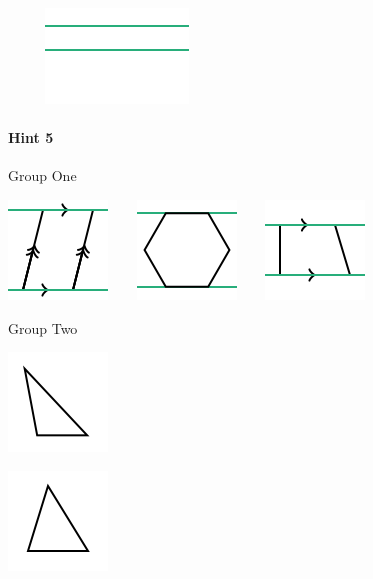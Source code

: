 \documentclass[twocolumn,10pt]{article}
\def\shrinkfactor{0.55}
\begin{document}
$\phantom{xxxx}$
\includegraphics[scale=\shrinkfactor]{figures/7cf1fbfb7516a57d37ad80007a3886c81c33f393.png}  


\paragraph{Hint 5}Group One 


\includegraphics[scale=\shrinkfactor]{figures/dc97e97ad57144cae5a8b5bfdc5d541d8d66aa00.png}$\phantom{xxx}$
\includegraphics[scale=\shrinkfactor]{figures/a8914ec8b688d03af4fc47bdfdb83edcce453d65.png}$\phantom{xxx}$
\includegraphics[scale=\shrinkfactor]{figures/c65c46cb76be1527eb7ded9b879ae1272452b7a1.png}  


Group Two


\includegraphics[scale=\shrinkfactor]{figures/2d844a51b839d81f30ea0fd7869869c78159abd0.png}

\includegraphics[scale=\shrinkfactor]{figures/ee7f87a00acb47dec4f2b2eed9a6741b21afc47d.png}
\end{document}

